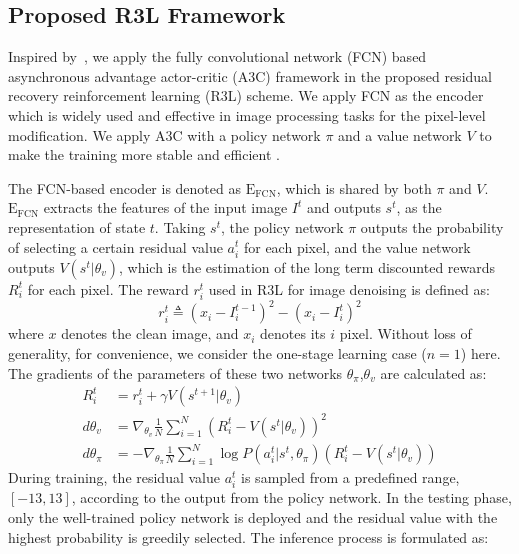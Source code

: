 \documentclass{article}
\begin{document}
\subsection{Proposed R3L Framework}
Inspired by~\cite{furuta2019fully}, we apply the fully convolutional network (FCN) based asynchronous advantage actor-critic (A3C) \cite{mnih2016asynchronous} framework in the proposed residual recovery reinforcement learning (R3L) scheme. We apply FCN as the encoder which is widely used and effective in image processing tasks for the pixel-level modification. We apply A3C with a policy network $\pi$ and a value network $V$ to make the training more stable and efficient \cite{NIPS1999_464d828b}.

The FCN-based encoder is denoted as $\text{E}_\text{FCN}$, which is shared by both $\pi$ and $V$. 
$\text{E}_\text{FCN}$ extracts the features of the input image $I^t$ and outputs $s^t$, as the representation of state $t$.
Taking $s^t$, the policy network $\pi$ outputs the probability of selecting a certain residual value $a_i^t$ for each pixel, and the value network outputs $V(s^{t}|\theta_v)$, which is the estimation of the long term discounted rewards $R_i^t$ for each pixel. 
The reward $r_i^t$ used in R3L for image denoising is defined as:
\begin{equation}
    r_i^t \triangleq (x_i-I_i^{t-1})^2-(x_i-I_i^t)^2
\end{equation}
where $x$ denotes the clean image, and $x_i$ denotes its $i$ pixel.
Without loss of generality, for convenience, we consider the one-stage learning case ($n=1$) here. The gradients of the parameters of these two networks $\theta_\pi$,$\theta_v$ are calculated as:
\begin{equation}
\begin{aligned}
     R_i^t &= r_i^t+\gamma V(s^{t+1}|\theta_v)\\
     d\theta_v &= \nabla_{\theta_v}\frac{1}{N}\sum_{i=1}^N(R_i^t-V(s^t|\theta_v))^2\\
     d\theta_\pi &= -\nabla_{\theta_\pi}\frac{1}{N}\sum_{i=1}^N\log P(a_i^t|s^t,\theta_\pi)(R_i^t-V(s^t|\theta_v))
\end{aligned}
\end{equation}
During training, the residual value $a_i^t$ is sampled from a predefined range, \ie~ $\left[-13,13\right]$, according to the output from the policy network. In the testing phase, only the well-trained policy network is deployed and the residual value with the highest probability is greedily selected. The inference process is formulated as:
\end{document}

